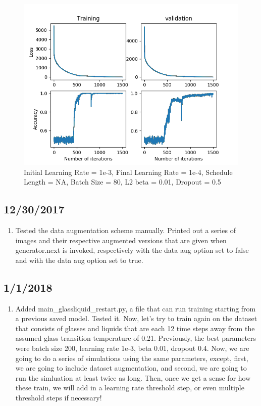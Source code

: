 \documentclass[12pt,reqno]{amsart}
\numberwithin{equation}{section}
\begin{document}
\begin{enumerate}
\begin{figure}[H]
\centering
\includegraphics[scale=0.6]{Commit-test-7}
\caption{Initial Learning Rate = 1e-3, Final Learning Rate = 1e-4, Schedule Length = NA, Batch Size = 80, L2 beta = 0.01, Dropout = 0.5}
\end{figure}


\end{enumerate}

\subsection{12/30/2017}
\begin{enumerate}
\item Tested the data augmentation scheme manually.  Printed out a series of images and their respective augmented versions that are given when generator.next is invoked, respectively with the data aug option set to false and with the data aug option set to true.  

\end{enumerate}

\subsection{1/1/2018}
\begin{enumerate}
\item Added main\_glassliquid\_restart.py, a file that can run training starting from a previous saved model.  Tested it.  Now, let's try to train again on the dataset that consists of glasses and liquids that are each 12 time steps away from the assumed glass transition temperature of 0.21.  Previously, the best parameters were batch size 200, learning rate 1e-3, beta 0.01, dropout 0.4.  Now, we are going to do a series of simulations using the same parameters, except, first, we are going to include dataset augmentation, and second, we are going to run the simluation at least twice as long.  Then, once we get a sense for how these train, we will add in a learning rate threshold step, or even multiple threshold steps if necessary!     

\end{enumerate}
\end{document}
